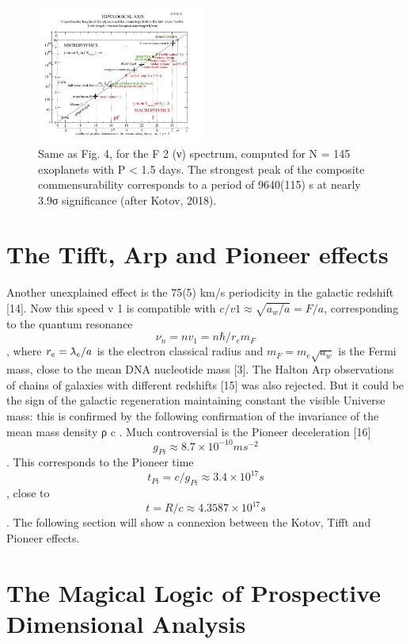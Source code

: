 \begin{figure}
\centering
\includegraphics[width=0.5\textwidth]{./figures/figure}
\caption{Same as Fig. 4, for the F 2 (ν) spectrum, computed for N = 145 exoplanets with P < 1.5
days. The strongest peak of the composite commensurability corresponds to a period of 9640(115) s
at nearly 3.9σ significance (after Kotov, 2018).}
\label{fig:figure_label}
\end{figure}


\section {The Tifft, Arp and Pioneer effects}

Another unexplained effect is the 75(5) km/s periodicity in the galactic redshift [14]. Now this
speed v 1 is compatible with $c/v 1 \approx \sqrt{a_{w} /a} = F/a$, corresponding to the quantum resonance $$\nu_{n} = nv_{1} =n\hbar /r_{e} m_{F} $$, where $r_{e} = \lambdabar_{e} /a$ is the electron classical radius and $m_{F} = m_{e} \sqrt{a_{w}}$ is the Fermi mass, close to the mean DNA nucleotide mass [3].
The Halton Arp observations of chains of galaxies with different redshifts [15] was also
rejected. But it could be the sign of the galactic regeneration maintaining constant the visible
Universe mass: this is confirmed by the following confirmation of the invariance of the mean mass
density ρ c .
Much controversial is the Pioneer deceleration [16] $$g_{Pi} \approx 8.7 \times 10^{-10} ms^{-2}$$ . This corresponds to
the Pioneer time $$t_{Pi} = c/g_{Pi} \approx 3.4 \times 10^{17} s$$, close to $$t = R/c \approx 4.3587 \times 10^{17} s$$. The following section will show a connexion between the Kotov, Tifft and Pioneer effects.

\section {The Magical Logic of Prospective Dimensional Analysis}

